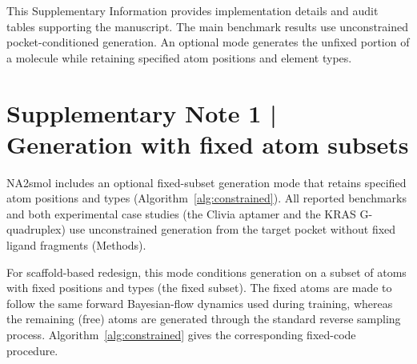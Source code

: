 \noindent This Supplementary Information provides implementation details and audit tables supporting the manuscript. The main benchmark results use unconstrained pocket-conditioned generation. An optional mode generates the unfixed portion of a molecule while retaining specified atom positions and element types.

\section*{Supplementary Note 1 | Generation with fixed atom subsets}

NA2smol includes an optional fixed-subset generation mode that retains specified atom positions and types (Algorithm~\ref{alg:constrained}). All reported benchmarks and both experimental case studies (the Clivia aptamer and the KRAS G-quadruplex) use unconstrained generation from the target pocket without fixed ligand fragments (Methods).

For scaffold-based redesign, this mode conditions generation on a subset of atoms with fixed positions and types (the fixed subset). The fixed atoms are made to follow the same forward Bayesian-flow dynamics used during training, whereas the remaining (free) atoms are generated through the standard reverse sampling process. Algorithm~\ref{alg:constrained} gives the corresponding fixed-code procedure.

